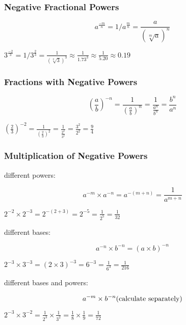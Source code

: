 \documentclass{article}
\begin{document}
\newpage

\subsubsection*{Negative Fractional Powers}
\begin{Large}
$$a^{\frac{-m}{n}}=1/a^{\frac{m}{n}}=\frac{a}{(\sqrt[m]{a})^n}$$
\end{Large}
\begin{center}
 $3^{\frac{-2}{3}}=1/3^{\frac{2}{3}}=\frac{1}{(\sqrt[2]{3})^3}\approx \frac{1}{1.73^3}\approx\frac{1}{5.20}\approx0.19$
\end{center}

\vspace{16pt}
\subsubsection*{Fractions with Negative Powers}
\begin{Large}
$$(\frac{a}{b})^{-n}=\frac{1}{({\frac{a}{b}})^n}=\frac{1}{\frac{a^n}{b^n}}=\frac{b^n}{a^n}$$
\end{Large}
\begin{center}
$(\frac{2}{3})^{-2}=\frac{1}{({\frac{2}{3}})^2}=\frac{1}{\frac{2^2}{3^2}}=\frac{3^2}{2^2}=\frac{9}{4}$
\end{center}

\newpage
\subsubsection*{Multiplication of Negative Powers}
different powers:
\begin{Large}
$$a^{-m} \times a^{-n}=a^{-(m+n)}=\frac{1}{a^{m+n}}$$
\end{Large}
\begin{center}
$2^{-2} \times 2^{-3}=2^{-(2+3)}=2^{-5}=\frac{1}{2^5}=\frac{1}{32}$
\end{center}

different bases:
\begin{Large}
$$a^{-n}\times b^{-n}=(a\times b)^{-n}$$
\end{Large}
\begin{center}
$2^{-3}\times 3^{-3}=(2\times 3)^{-3}=6^{-3}= \frac{1}{6^3}=\frac{1}{216}$
\end{center}

different bases and powers:
\begin{Large}
$$a^{-m} \times b^{-n}\text{\normalsize (calculate separately)}$$
\end{Large}
\begin{center}
$2^{-3} \times 3^{-2}=\frac{1}{2^3} \times \frac{1}{3^2}=\frac{1}{8} \times \frac{1}{9}=\frac{1}{72}$
\end{center}
\end{document}
